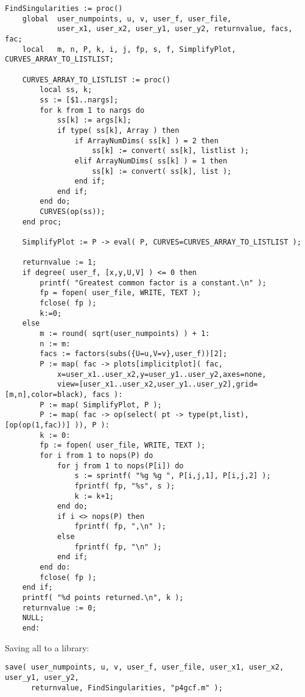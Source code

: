 \documentclass[a4paper,10pt]{article}
\begin{document}
\begin{lstlisting}[name=p4gcf]
FindSingularities := proc()
    global  user_numpoints, u, v, user_f, user_file,
            user_x1, user_x2, user_y1, user_y2, returnvalue, facs, fac;
    local   m, n, P, k, i, j, fp, s, f, SimplifyPlot, CURVES_ARRAY_TO_LISTLIST;

    CURVES_ARRAY_TO_LISTLIST := proc()
        local ss, k;
        ss := [$1..nargs];
        for k from 1 to nargs do
            ss[k] := args[k];
            if type( ss[k], Array ) then
                if ArrayNumDims( ss[k] ) = 2 then
                    ss[k] := convert( ss[k], listlist );
                elif ArrayNumDims( ss[k] ) = 1 then
                    ss[k] := convert( ss[k], list );
                end if;
            end if;
        end do;
        CURVES(op(ss));
    end proc;
    
    SimplifyPlot := P -> eval( P, CURVES=CURVES_ARRAY_TO_LISTLIST );
    
    returnvalue := 1;
    if degree( user_f, [x,y,U,V] ) <= 0 then
        printf( "Greatest common factor is a constant.\n" );
        fp = fopen( user_file, WRITE, TEXT );
        fclose( fp );
        k:=0;
    else
        m := round( sqrt(user_numpoints) ) + 1:
        n := m:
        facs := factors(subs({U=u,V=v},user_f))[2];
        P := map( fac -> plots[implicitplot]( fac,
            x=user_x1..user_x2,y=user_y1..user_y2,axes=none,
            view=[user_x1..user_x2,user_y1..user_y2],grid=[m,n],color=black), facs ):
        P := map( SimplifyPlot, P );
        P := map( fac -> op(select( pt -> type(pt,list), [op(op(1,fac))] )), P ):
        k := 0:
        fp := fopen( user_file, WRITE, TEXT );
        for i from 1 to nops(P) do
            for j from 1 to nops(P[i]) do
                s := sprintf( "%g %g ", P[i,j,1], P[i,j,2] );
                fprintf( fp, "%s", s );
                k := k+1;
            end do;
            if i <> nops(P) then
                fprintf( fp, ",\n" );
            else
                fprintf( fp, "\n" );
            end if;
        end do:
        fclose( fp );
    end if;
    printf( "%d points returned.\n", k );
    returnvalue := 0;
    NULL;
    end:
\end{lstlisting}

Saving all to a library:

\begin{lstlisting}[name=p4gcf]
save( user_numpoints, u, v, user_f, user_file, user_x1, user_x2, user_y1, user_y2,
      returnvalue, FindSingularities, "p4gcf.m" );
\end{lstlisting}
\end{document}
